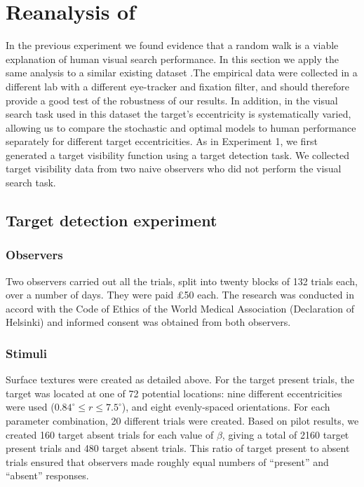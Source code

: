 \documentclass[preprint, authoryear]{elsarticle} %
\begin{document}
\section{Reanalysis of \cite{clarke2009}}
\label{sec:surfacesearch}

In the previous experiment we found evidence that a random walk is a viable explanation of human visual search performance. In this section we apply the same analysis to a similar existing dataset \citep{clarke2009}.The empirical data were collected in a different lab with a different eye-tracker and fixation filter, and should therefore provide a good test of the robustness of our results. In addition, in the visual search task used in this dataset the target's eccentricity is systematically varied, allowing us to compare the stochastic and optimal models to human performance separately for different target eccentricities. As in Experiment 1, we first generated a target visibility function using a target detection task. We collected target visibility data from two naive observers who did not perform the visual search task.

\subsection{Target detection experiment}


\subsubsection{Observers}

Two observers carried out all the trials, split into twenty blocks of 132 trials each, over a number of days. They were paid \pounds50 each. The research was conducted in accord with the Code of Ethics of the World Medical Association (Declaration of Helsinki) and informed consent was obtained from both observers. 

\subsubsection{Stimuli}

Surface textures were created as detailed above. For the target present trials, the target was located at one of 72 potential locations: nine different eccentricities were used ($0.84^{\circ}\leq r\leq 7.5^{\circ}$), and eight evenly-spaced orientations. For each parameter combination, 20 different trials were created.  Based on pilot results, we created 160 target absent trials for each value of $\beta$, giving a total of 2160 target present trials and 480 target absent trials. This ratio of target present to absent trials ensured that observers made roughly equal numbers of ``present'' and ``absent'' responses.
\end{document}
